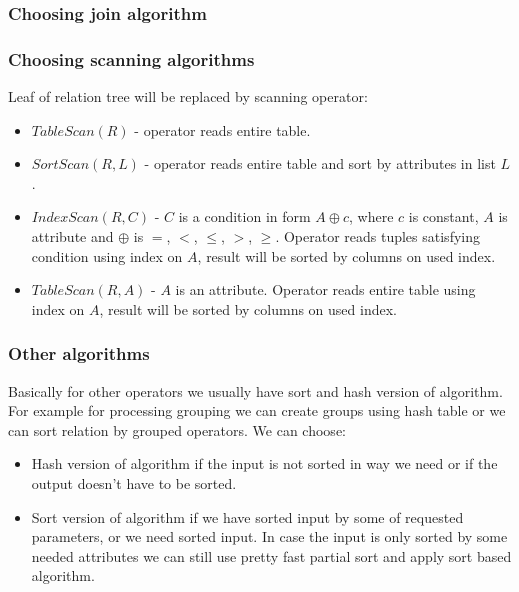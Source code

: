 \subsubsection{Choosing join algorithm}


\subsubsection{Choosing scanning algorithms}

Leaf of relation tree will be replaced by scanning operator:

\begin{itemize}
\item $TableScan(R)$ - operator reads entire table.

\item $SortScan(R,L)$ - operator reads entire table and sort by attributes in list $L$.

\item $IndexScan(R,C)$ - $C$ is a condition in form $A\oplus c$, where $c$ is constant, $A$ is attribute and $\oplus$ is $=$, $<$, $\leq$, $>$, $\geq$. Operator reads tuples satisfying condition using index on $A$, result will be sorted by columns on used index.

\item $TableScan(R,A)$ - $A$ is an attribute. Operator reads entire table using index on $A$, result will be sorted by columns on used index.

\end{itemize}

\subsubsection{Other algorithms}

Basically for other operators we usually have sort and hash version of algorithm. For example for processing grouping we can create groups using hash table or we can sort relation by grouped operators. We can choose:

\begin{itemize}
\item Hash version of algorithm if the input is not sorted in way we need or if the output doesn't have to be sorted.

\item Sort version of algorithm if we have sorted input by some of requested parameters, or we need sorted input. In case the input is only sorted by some needed attributes we can still use pretty fast partial sort and apply sort based algorithm.

\end{itemize}